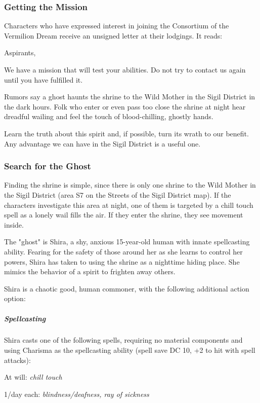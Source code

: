 \documentclass[10pt,a4paper,twoside,twocolumn,openany,nodeprecatedcode]{dndbook}
\begin{document}
\subsubsection{Getting the Mission}
Characters who have expressed interest in joining the Consortium of the Vermilion Dream receive an unsigned letter at their lodgings. It reads:

\begin{DndReadAloud}{}
Aspirants,

We have a mission that will test your abilities. Do not try to contact us again until you have fulfilled it.

Rumors say a ghost haunts the shrine to the Wild Mother in the Sigil District in the dark hours. Folk who enter or even pass too close the shrine at night hear dreadful wailing and feel the touch of blood-chilling, ghostly hands.

Learn the truth about this spirit and, if possible, turn its wrath to our benefit. Any advantage we can have in the Sigil District is a useful one.

\end{DndReadAloud}

\subsubsection{Search for the Ghost}
Finding the shrine is simple, since there is only one shrine to the Wild Mother in the Sigil District (area S7 on the Streets of the Sigil District map). If the characters investigate this area at night, one of them is targeted by a chill touch spell as a lonely wail fills the air. If they enter the shrine, they see movement inside.

The "ghost" is Shira, a shy, anxious 15-year-old human with innate spellcasting ability. Fearing for the safety of those around her as she learns to control her powers, Shira has taken to using the shrine as a nighttime hiding place. She mimics the behavior of a spirit to frighten away others.

Shira is a chaotic good, human commoner, with the following additional action option:

\begin{DndComment}{}
\subparagraph{Spellcasting}
Shira casts one of the following spells, requiring no material components and using Charisma as the spellcasting ability (spell save DC 10, +2 to hit with spell attacks):

At will: \textit{chill touch}

1/day each: \textit{blindness/deafness, ray of sickness}

\end{DndComment}
\end{document}

